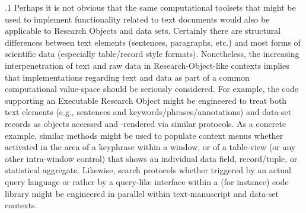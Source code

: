 \documentclass[11pt, twocolumn]{article}
\begin{document}
\p.1{%
Perhaps it is not obvious that the same computational toolsets that
might be used to implement functionality related to
text documents would also be applicable to Research Objects
and data sets. Certainly there are structural differences
between text elements (sentences, paragraphs, etc.) and
most forms of scientific data (especially table/record style
formats). Nonetheless, the increasing interpenetration of
text and raw data in Research-Object-like contexts implies
that implementations regarding text and data as part of a
common computational value-space should be seriously considered.
For example, the code supporting an Executable Research Object
might be engineered to treat both text elements (e.g.,
sentences and keywords/phrases/annotations) and data-set
records as objects accessed and -rendered via similar
protocols. As a concrete example, similar methods might be
used to populate context menus whether activated in the area
of a keyphrase within a  window, or of a table-view
(or any other intra-window control) that shows an individual
data field, record/tuple, or statistical aggregate. Likewise,
search protocols \mdash{} whether triggered by an actual query language
or rather by a query-like interface within a (for instance)
 code library \mdash{} might be engineered in parallel within
text-manuscript and data-set contexts.
}%
\end{document}
